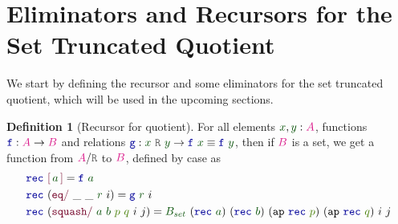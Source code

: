 \documentclass[twoside,11pt,openright]{report}
\theoremstyle{plain} %
\theoremstyle{definition}
\newtheorem{defn}[thm]{Definition}%
\theoremstyle{remark}
\newcommand*{\term}[1]{\textcolor{green!30!black}{#1}} %
\newcommand*{\pathterm}[1]{\textcolor{green!65!red!75!black}{#1}}
\newcommand*{\type}[1]{\textcolor{magenta!90!black}{#1}}
\newcommand*{\relation}[1]{\textcolor{gray!75!black}{\ensuremath{\mathtt{#1}}}}
\newcommand*{\function}[1]{\textcolor{blue!60!black}{\ensuremath{\mathtt{#1}}}}
\newcommand*{\constructor}[1]{\textcolor{purple!60!black}{\ensuremath{\mathtt{#1}}}}
\newcommand*{\quotientconstructor}[1]{\constructor{[}\,#1\,\constructor{]}}
\begin{document}
\section{Eliminators and Recursors for the Set Truncated Quotient}
We start by defining the recursor and some eliminators for the set truncated quotient, which will be used in the upcoming sections.
\begin{defn}[Recursor for quotient]
  \label{defn:quotient-recursor}
  For all elements \(\term{x}, \term{y} : \type{A}\), functions \(\function{f} : \type{A} \rightarrow \type{B}\) and relations \(\function{g} : \term{x}~\relation{R}~\term{y} \rightarrow \function{f}~\term{x} \equiv \function{f}~\term{y}\), then if \(\type{B}\) is a set, we get a function from \(\type{A} / \relation{R}\) to \(\type{B}\), defined by case as
  \begin{equation}
    \label{eq:quotient-recursor}
    \begin{aligned}
      &\function{rec}~\quotientconstructor{\term{a}} = \function{f}~\term{a} \\
      &\function{rec}~(\constructor{eq/}~\_~\_~\term{r}~i) = \function{g}~\term{r}~i \\
      &\function{rec}~(\constructor{squash/}~\term{a}~\term{b}~\pathterm{p}~\pathterm{q}~i~j) = \term{B_{set}}~(\function{rec}~\term{a})~(\function{rec}~\term{b})~(\mathtt{ap}~\function{rec}~\pathterm{p})~(\mathtt{ap}~\function{rec}~\pathterm{q})~i~j
    \end{aligned}
  \end{equation}
\end{defn}
\end{document}
